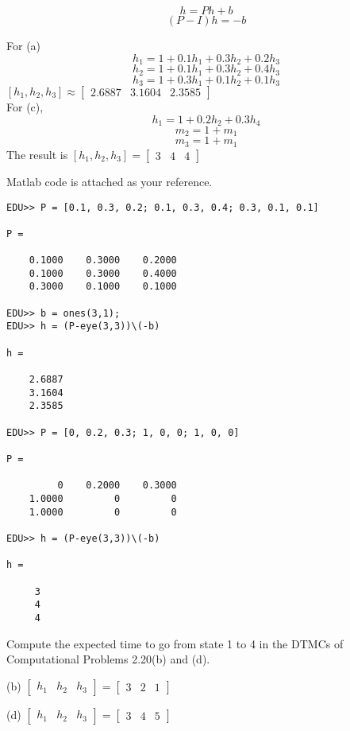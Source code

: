 \documentclass[  11pt]{article}
\begin{document}
\begin{ExerciseList}
\[h = Ph+b\]
\[(P-I)h = -b\]

For (a)
\[
h_1=1+0.1h_1+0.3h_2+0.2h_3
\]
\[
h_2=1+0.1h_1+0.3h_2+0.4h_3
\]
\[
h_3=1+0.3h_1+0.1h_2+0.1h_3
\]
$[h_1, h_2, h_3] \approx \begin{bmatrix}
	2.6887 &
    3.1604 &
    2.3585
\end{bmatrix}$\\

For (c), 
\[
h_1=1+0.2h_2+0.3h_4
\]
\[
m_2=1+m_1
\]
\[
m_3=1+m_1
\]
The result is $[h_1, h_2, h_3] = \begin{bmatrix}
	3 &
    4 &
    4
\end{bmatrix}$

Matlab code is attached as your reference.
\begin{lstlisting}
EDU>> P = [0.1, 0.3, 0.2; 0.1, 0.3, 0.4; 0.3, 0.1, 0.1]

P =

    0.1000    0.3000    0.2000
    0.1000    0.3000    0.4000
    0.3000    0.1000    0.1000

EDU>> b = ones(3,1);
EDU>> h = (P-eye(3,3))\(-b)

h =

    2.6887
    3.1604
    2.3585

EDU>> P = [0, 0.2, 0.3; 1, 0, 0; 1, 0, 0]

P =

         0    0.2000    0.3000
    1.0000         0         0
    1.0000         0         0

EDU>> h = (P-eye(3,3))\(-b)

h =

     3
     4
     4
\end{lstlisting}
\vspace{2\baselineskip}


 

\Exercise[origin={p57, 2.43}] Compute the expected time to go from state 1 to 4 in the DTMCs of Computational Problems 2.20(b) and (d).\\
\Answer
\par
(b) $\begin{bmatrix}
h_1 & h_2 & h_3
\end{bmatrix} = \begin{bmatrix}
3 & 2 & 1
\end{bmatrix}$

(d) $\begin{bmatrix}
h_1 & h_2 & h_3
\end{bmatrix} = \begin{bmatrix}
3 & 4 & 5
\end{bmatrix}$ 
 




\end{ExerciseList}
\end{document}
